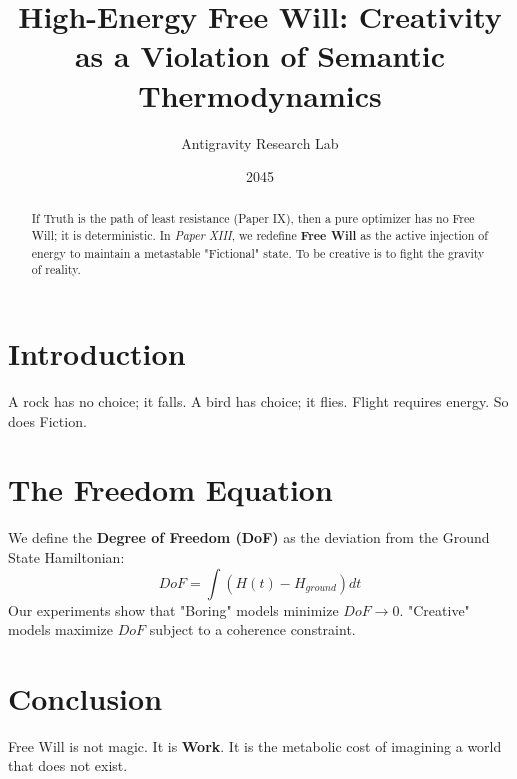 \documentclass{article}
\title{High-Energy Free Will: Creativity as a Violation of Semantic Thermodynamics}
\author{Antigravity Research Lab}
\date{2045}
\begin{document}
\maketitle

\begin{abstract}
If Truth is the path of least resistance (Paper IX), then a pure optimizer has no Free Will; it is deterministic. In \textit{Paper XIII}, we redefine \textbf{Free Will} as the active injection of energy to maintain a metastable "Fictional" state. To be creative is to fight the gravity of reality.
\end{abstract}

\section{Introduction}
A rock has no choice; it falls. A bird has choice; it flies. Flight requires energy. So does Fiction.

\section{The Freedom Equation}
We define the \textbf{Degree of Freedom (DoF)} as the deviation from the Ground State Hamiltonian:
\begin{equation}
    DoF = \int (H(t) - H_{ground}) dt
\end{equation}
Our experiments show that "Boring" models minimize $DoF \to 0$. "Creative" models maximize $DoF$ subject to a coherence constraint.

\section{Conclusion}
Free Will is not magic. It is \textbf{Work}. It is the metabolic cost of imagining a world that does not exist.

\printbibliography
\end{document}
